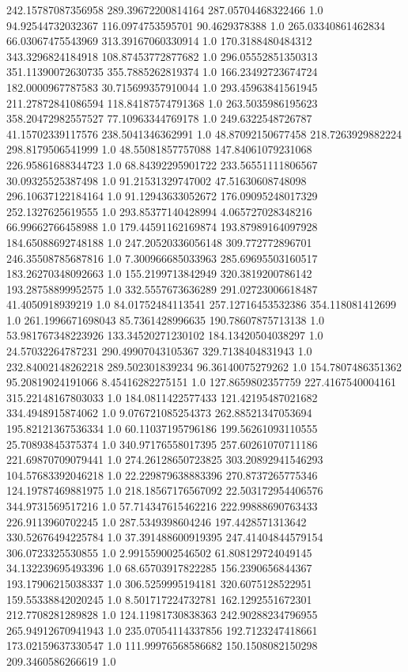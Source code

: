 242.15787087356958	289.39672200814164	287.05704468322466	1.0
94.92544732032367	116.0974753595701	90.4629378388	1.0
265.03340861462834	66.03067475543969	313.39167060330914	1.0
170.3188480484312	343.3296824184918	108.87453772877682	1.0
296.05552851350313	351.11390072630735	355.7885262819374	1.0
166.23492723674724	182.0000967787583	30.715699357910044	1.0
293.45963841561945	211.27872841086594	118.84187574791368	1.0
263.5035986195623	358.20472982557527	77.10963344769178	1.0
249.6322548726787	41.15702339117576	238.5041346362991	1.0
48.87092150677458	218.7263929882224	298.8179506541999	1.0
48.55081857757088	147.84061079231068	226.95861688344723	1.0
68.84392295901722	233.56551111806567	30.09325525387498	1.0
91.21531329747002	47.51630608748098	296.10637122184164	1.0
91.12943633052672	176.09095248017329	252.1327625619555	1.0
293.85377140428994	4.065727028348216	66.99662766458988	1.0
179.44591162169874	193.87989164097928	184.65088692748188	1.0
247.20520336056148	309.772772896701	246.35508785687816	1.0
7.300966685033963	285.69695503160517	183.26270348092663	1.0
155.2199713842949	320.3819200786142	193.28758899952575	1.0
332.5557673636289	291.02723006618487	41.4050918939219	1.0
84.01752484113541	257.12716453532386	354.118081412699	1.0
261.1996671698043	85.7361428996635	190.78607875713138	1.0
53.981767348223926	133.34520271230102	184.13420504038297	1.0
24.57032264787231	290.49907043105367	329.7138404831943	1.0
232.84002148262218	289.502301839234	96.36140075279262	1.0
154.7807486351362	95.20819024191066	8.45416282275151	1.0
127.8659802357759	227.4167540004161	315.22148167803033	1.0
184.0811422577433	121.42195487021682	334.4948915874062	1.0
9.076721085254373	262.88521347053694	195.82121367536334	1.0
60.11037195796186	199.56261093110555	25.70893845375374	1.0
340.97176558017395	257.60261070711186	221.69870709079441	1.0
274.26128650723825	303.20892941546293	104.57683392046218	1.0
22.229879638883396	270.8737265775346	124.19787469881975	1.0
218.18567176567092	22.503172954406576	344.9731569517216	1.0
57.714347615462216	222.99888690763433	226.9113960702245	1.0
287.5349398604246	197.4428571313642	330.52676494225784	1.0
37.391488600919395	247.41404844579154	306.0723325530855	1.0
2.991559002546502	61.808129724049145	34.132239695493396	1.0
68.65703917822285	156.2390656844367	193.17906215038337	1.0
306.5259995194181	320.6075128522951	159.55338842020245	1.0
8.501717224732781	162.1292551672301	212.7708281289828	1.0
124.11981730838363	242.90288234796955	265.94912670941943	1.0
235.07054114337856	192.7123247418661	173.02159637330547	1.0
111.99976568586682	150.1508082150298	209.3460586266619	1.0
